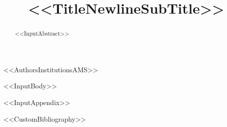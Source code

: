 \documentclass[<<DocumentClassOptions>>]{mcom-l}
\begin{document}
\title[<<ShortTitle>>]{<<TitleNewlineSubTitle>>}

<<AuthorsInstitutionsAMS>>


\date{}


\begin{abstract}
<<InputAbstract>>
\end{abstract}

\maketitle

<<InputBody>>

\appendix
<<InputAppendix>>


<<CustomBibliography>>
\end{document}

